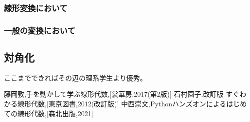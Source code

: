 \documentclass[10pt]{jsarticle}
\theoremstyle{definition}%
\numberwithin{equation}{section}%
\begin{document}
\subsubsection{線形変換において}
\subsubsection{一般の変換において}
\subsection{対角化}
ここまでできればその辺の理系学生より優秀。
\begin{thebibliography}{99}
   藤岡敦,手を動かして学ぶ線形代数,[裳華房,2017(第2版)]
   石村園子,改訂版 すぐわかる線形代数,[東京図書,2012(改訂版)]
   中西崇文,Pythonハンズオンによるはじめての線形代数,[森北出版,2021]
\end{thebibliography}
\end{document}
